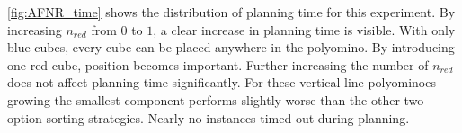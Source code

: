 \autoref{fig:AFNR_time} shows the distribution of planning time for this experiment.
By increasing $n_\textit{red}$ from $0$ to $1$, a clear increase in planning time is visible.
With only blue cubes, every cube can be placed anywhere in the polyomino.
By introducing one red cube, position becomes important.
Further increasing the number of $n_\textit{red}$ does not affect planning time significantly.
For these vertical line polyominoes growing the smallest component performs slightly worse than the other two option sorting strategies.
Nearly no instances timed out during planning. 



